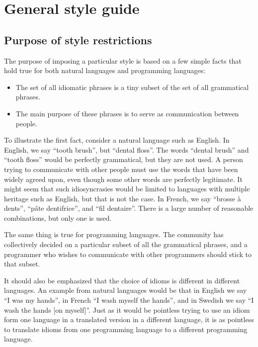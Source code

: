 \chapter{General \commonlisp{} style guide}

\section{Purpose of style restrictions}

The purpose of imposing a particular style is based on a few simple
facts that hold true for both natural languages and programming
languages:

\begin{itemize}
\item The set of all idiomatic phrases is a tiny subset of the set of
  all grammatical phrases.
\item The main purpose of these phrases is to serve as communication
  between people.
\end{itemize}

To illustrate the first fact, consider a natural language such as
English.  In English, we say ``tooth brush'', but ``dental floss''.
The words ``dental brush'' and ``tooth floss'' would be perfectly
grammatical, but they are not used.  A person trying to communicate
with other people must use the words that have been widely agreed
upon, even though some other words are perfectly legitimate.  It might
seem that such idiosyncrasies would be limited to languages with
multiple heritage such as English, but that is not the case.  In
French, we say ``brosse à dents'', ``pâte dentifrice'', and ``fil
dentaire''.  There is a large number of reasonable combinations, but
only one is used.

The same thing is true for programming languages.  The community has
collectively decided on a particular subset of all the grammatical
phrases, and a programmer who wishes to communicate with other
programmers should stick to that subset.

It should also be emphasized that the choice of idioms is different in
different languages.  An example from natural languages would be that
in English we say ``I was my hands'', in French ``I wash myself the
hands'', and in Swedish we say ``I wash the hands [on myself]''.  Just
as it would be pointless trying to use an idiom form one language in a
translated version in a different language, it is as pointless to
translate idioms from one programming language to a different
programming language.


